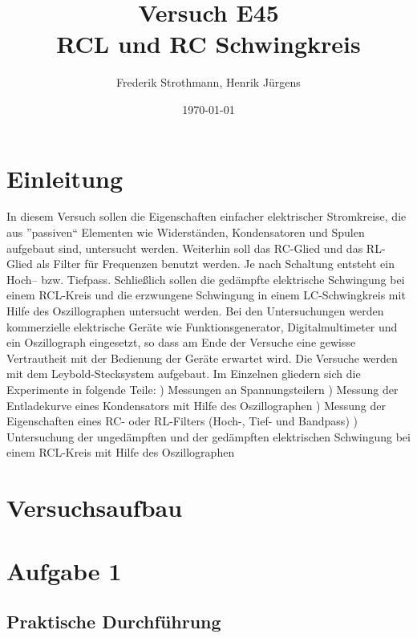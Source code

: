 \documentclass[12pt]{scrartcl}
\title{Versuch E45\\ RCL und RC Schwingkreis}
\author{Frederik Strothmann, Henrik Jürgens}
\date{\today}
\begin{document}

\maketitle
\newpage
\tableofcontents
\newpage


\section{Einleitung}

In diesem Versuch sollen die Eigenschaften einfacher elektrischer Stromkreise, die aus ”passiven“ Elementen wie
Widerständen, Kondensatoren und Spulen aufgebaut sind, untersucht werden. Weiterhin soll das RC-Glied und das
RL-Glied als Filter für Frequenzen benutzt werden. Je nach Schaltung entsteht ein Hoch– bzw. Tiefpass. Schließlich sollen die gedämpfte elektrische Schwingung bei einem RCL-Kreis und die erzwungene Schwingung
in einem LC-Schwingkreis mit Hilfe des Oszillographen untersucht werden. Bei den Untersuchungen werden kommerzielle elektrische Geräte wie Funktionsgenerator, Digitalmultimeter und ein Oszillograph eingesetzt, so dass am Ende der Versuche eine gewisse Vertrautheit mit der Bedienung der Geräte erwartet wird. Die Versuche werden mit dem Leybold-Stecksystem aufgebaut. Im Einzelnen gliedern sich die Experimente in folgende Teile:
)
Messungen an Spannungsteilern
)
Messung der Entladekurve eines Kondensators mit Hilfe des Oszillographen
)
Messung der Eigenschaften eines RC- oder RL-Filters (Hoch-, Tief- und Bandpass)
)
Untersuchung der ungedämpften und der gedämpften elektrischen Schwingung bei einem RCL-Kreis mit Hilfe des Oszillographen

\section{Versuchsaufbau}


\section{Aufgabe 1}
\subsection{Praktische Durchführung}
\end{document}

